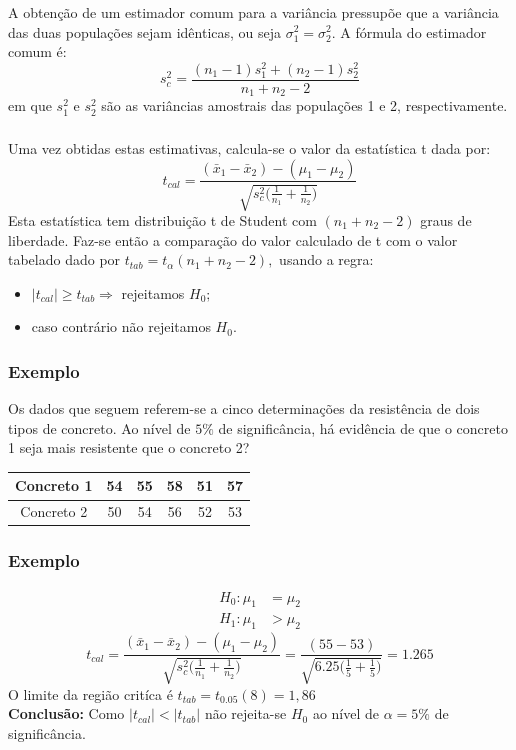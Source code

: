 \documentclass[14pt,aspectratio=1610]{beamer}
\newcommand{\bx}{\ensuremath{\bar{x}}}
\newcommand{\Ho}{\ensuremath{H_{0}}}
\begin{document}
\begin{frame}{}
\frametitle{}
\begin{block}{}
\justifying
A obtenção de um estimador comum para a variância pressupõe que a variância das duas populações sejam idênticas, ou 
seja $\sigma^{2}_{1}=\sigma^{2}_{2}.$ A fórmula do estimador comum é:
$$s_{c}^{2}=\dfrac{(n_{1}-1)s_{1}^{2}+(n_{2}-1)s_{2}^{2}}{n_{1}+n_{2}-2}$$
em que $s_{1}^{2}$ e $s_{2}^{2}$ são as variâncias amostrais das populações 1 e 2, respectivamente. 
\end{block}
\end{frame}

\begin{frame}{}
\frametitle{}
\begin{block}{}
\justifying
Uma vez obtidas estas estimativas, calcula-se o valor da estatística 
t dada por:
$$t_{cal}=\dfrac{(\bx_{1}-\bx_{2})-(\mu_{1}-\mu_{2})}{\sqrt{s_{c}^{2}\Biggl(\frac{1}{n_{1}}+\frac{1}{n_{2}}\Biggl)}}$$ 
Esta estatística tem distribuição t de Student com $(n_{1}+n_{2}-2)$ graus de liberdade. Faz-se então a comparação do valor 
calculado de t com o valor tabelado dado por $t_{tab}=t_{\alpha}(n_{1}+n_{2}-2),$ usando a regra:
\begin{itemize}
\item $|t_{cal}|\geq t_{tab}\Rightarrow$ rejeitamos $\Ho;$
\item caso contrário não rejeitamos $\Ho.$
\end{itemize}
\end{block}
\end{frame}

\begin{frame}{}
\frametitle{Exemplo}
\begin{block}{}
\justifying
Os dados que seguem referem-se a cinco determinações da resistência de dois tipos de concreto. Ao nível de $5\%$ de significância, há evidência de que o concreto 
1 seja mais resistente que o concreto 2?
\begin{table}[]
\begin{tabular}{c|ccccc}
Concreto 1 & 54 & 55 & 58 & 51 & 57 \\ \hline
Concreto 2 & 50 & 54 & 56 & 52 & 53
\end{tabular}
\end{table}
\end{block}
\end{frame}

\begin{frame}{}
\frametitle{Exemplo}
\begin{block}{}
\justifying
\begin{align*}
H_{0}: \mu_{1}&=\mu_{2} \\ 
H_{1}: \mu_{1}&> \mu_{2}
\end{align*}
$$t_{cal}=\dfrac{(\bx_{1}-\bx_{2})-(\mu_{1}-\mu_{2})}{\sqrt{s_{c}^{2}\Biggl(\frac{1}{n_{1}}+\frac{1}{n_{2}}\Biggl)}}=
                 \dfrac{(55-53)}{\sqrt{6.25\Biggl(\frac{1}{5}+\frac{1}{5}\Biggl)}}=1.265$$
O limite da região critíca é $t_{tab}=t_{0.05}(8)=1,86$\\
\textbf{Conclusão:} Como $|t_{cal}|<|t_{tab}|$ não rejeita-se $\Ho$ ao nível de $\alpha=5\%$ de significância.
\end{block}
\end{frame}
\end{document}
